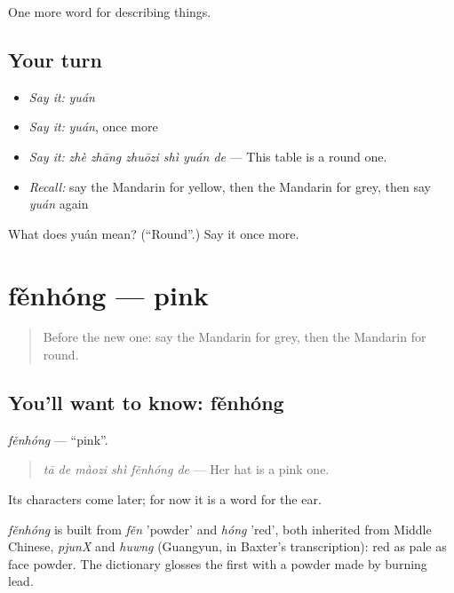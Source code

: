 \begin{grammarlens}[title={What you've built}]
One more word for describing things.
\end{grammarlens}

\subsection*{Your turn}
\begin{itemize}
\raggedright
  \item \emph{Say it:} \emph{yuán}
  \item \emph{Say it:} \emph{yuán}, once more
  \item \emph{Say it:} \emph{zhè zhāng zhuōzi shì yuán de} — This table is a round one.
  \item \emph{Recall:} say the Mandarin for yellow, then the Mandarin for grey, then say \emph{yuán} again
\end{itemize}

\begin{tcolorbox}[breakable,colback=teal!4,colframe=teal!35!black,title={Before you move on}]
What does yuán mean? (\textquotedblleft{}Round\textquotedblright{}.) Say it once more.
\end{tcolorbox}
\section[fěnhóng]{fěnhóng — pink}

\label{lesson:ZH-C139-fenhong}



\begin{quote}
Before the new one: say the Mandarin for grey, then the Mandarin for round.
\end{quote}

\subsection*{You'll want to know: fěnhóng}
\emph{fěnhóng} — \textquotedblleft{}pink\textquotedblright{}.

\begin{quote}
\emph{tā de màozi shì fěnhóng de} — Her hat is a pink one.
\end{quote}

Its characters come later; for now it is a word for the ear.

\begin{cousinweb}
\emph{fěnhóng} is built from \emph{fěn} 'powder' and \emph{hóng} 'red', both inherited from Middle Chinese, \emph{pjunX} and \emph{huwng} (Guangyun, in Baxter's transcription): red as pale as face powder. The dictionary glosses the first with a powder made by burning lead.
\end{cousinweb}

